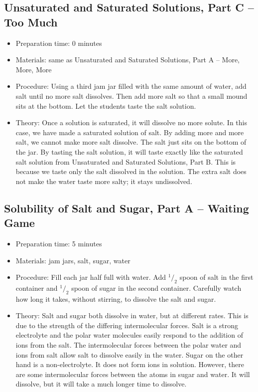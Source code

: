 \subsection{Unsaturated and Saturated Solutions, Part C -- Too Much}
\begin{itemize}
\item{Preparation time: 0 minutes}
\item{Materials: same as Unsaturated and Saturated Solutions, Part A -- More, More, More}
\item{Procedure: Using a third jam jar filled with the same amount of water, add salt until no more salt dissolves. Then add more salt so that a small mound sits at the bottom. Let the students taste the salt solution.}
\item{Theory:  Once a solution is saturated, it will dissolve no more solute. In this case, we have made a saturated solution of salt. By adding more and more salt, we cannot make more salt dissolve. The salt just sits on the bottom of the jar. By tasting the salt solution, it will taste exactly like the saturated salt solution from Unsaturated and Saturated Solutions, Part B. This is because we taste only the salt dissolved in the solution. The extra salt does not make the water taste more salty; it stays undissolved.}
\end{itemize}

\subsection{Solubility of Salt and Sugar, Part A -- Waiting Game}
\begin{itemize}
\item{Preparation time: 5 minutes}
\item{Materials: jam jars, salt, sugar, water}
\item{Procedure: Fill each jar half full with water. Add $^1/_2$ spoon of salt in the first container and $^1/_2$ spoon of sugar in the second container. Carefully watch how long it takes, without stirring, to dissolve the salt and sugar.}
\item{Theory: Salt and sugar both dissolve in water, but at different rates. This is due to the strength of the differing intermolecular forces. Salt is a strong electrolyte and the polar water molecules easily respond to the addition of ions from the salt. The intermolecular forces between the polar water and ions from salt allow salt to dissolve easily in the water. Sugar on the other hand is a non-electrolyte. It does not form ions in solution. However, there are some intermolecular forces between the atoms in sugar and water. It will dissolve, but it will take a much longer time to dissolve.}
\end{itemize}

